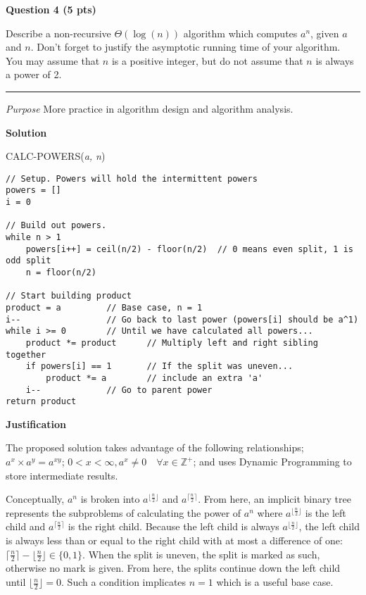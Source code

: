 \documentclass{article}
\newcommand\floor[1]{\lfloor#1\rfloor}  %
\newcommand\ceil[1]{\lceil#1\rceil}     %
\begin{document}
\newpage


\begin{framed}
    \textbf{Question 4 (5 pts)} 
    
    Describe a non-recursive $\Theta(\log(n))$ algorithm which computes $a^n$,
    given $a$ and $n$. Don’t forget to justify the asymptotic running time of
    your algorithm. You may assume that $n$ is a positive integer, but do not
    assume that $n$ is always a power of 2.
    
    \rule{\textwidth}{.2pt}
    
    \textit{Purpose} More practice in algorithm design and algorithm analysis.
\end{framed}


\textbf{Solution}

CALC-POWERS(\textit{a, n})
\begin{verbatim}
// Setup. Powers will hold the intermittent powers
powers = []
i = 0

// Build out powers. 
while n > 1
    powers[i++] = ceil(n/2) - floor(n/2)  // 0 means even split, 1 is odd split
    n = floor(n/2)

// Start building product
product = a         // Base case, n = 1
i--                 // Go back to last power (powers[i] should be a^1)
while i >= 0        // Until we have calculated all powers...
    product *= product      // Multiply left and right sibling together
    if powers[i] == 1       // If the split was uneven...    
        product *= a        // include an extra 'a'
    i--             // Go to parent power
return product
\end{verbatim}

\textbf{Justification}

The proposed solution takes advantage of the following relationships;
$a^{x} \times a^{y} = a^{xy}$; $0 < x < \infty, a^x \ne 0 \quad \forall x \in
\mathbb{Z^+}$; and uses Dynamic Programming to store intermediate results.
 
Conceptually, $a^n$ is broken into $a^{\floor{\frac{n}{2}}}$ and 
$a^{\ceil{\frac{n}{2}}}$. From here, an implicit binary tree represents the
subproblems of calculating the power of $a^n$ where $a^{\floor{\frac{n}{2}}}$ is
the left child and $a^{\ceil{\frac{n}{2}}}$ is the right child. Because the left
child is always $a^{\floor{\frac{n}{2}}}$, the left child is always less than or
equal to the right child with at most a difference of one: $\ceil{\frac{n}{2}} -
\floor{\frac{n}{2}} \in \{0, 1\}$. When the split is uneven, the split is marked
as such, otherwise no mark is given. From here, the splits continue down the left
child until $\floor{\frac{n}{2}} = 0$. Such a condition implicates $n = 1$ which
is a useful base case. 
\end{document}
